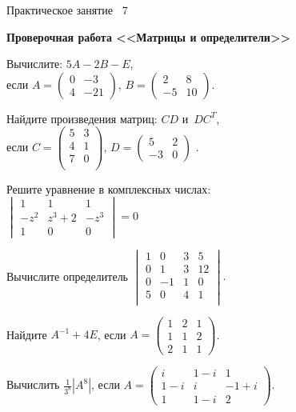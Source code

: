 \documentclass[a5paper,17pt]{extarticle}
\begin{document}
\begin{enumerate}
{\item[]\centering \small Практическое занятие \textnumero~7 
\par\bfseries Проверочная работа <<Матрицы и определители>>\par}

\item Вычислите: $5A-2B-E$,\\ если
$A=\begin{pmatrix}0&-3\\4&-21\end{pmatrix}$,
$B=\begin{pmatrix}2&8\\-5&10\end{pmatrix}$.

\item Найдите произведения матриц: $CD$ и~$DC^T$,\\ если
$C=\begin{pmatrix}5&3\\4 & 1\\ 7 & 0\\ \end{pmatrix}$, 
$D=\begin{pmatrix}5&2\\-3&0\end{pmatrix}$ .

\item Решите уравнение в комплексных числах: \\
$\begin{vmatrix}
1& 1& 1\\
-z^2& z^3+2& -z^3\\
1& 0& 0
\end{vmatrix}=0$



\item Вычислите определитель $
\begin{vmatrix}
1 & 0 & 3 & 5 \\
0 & 1 & 3 & 12\\
0 & -1 & 1 & 0\\
5 & 0 & 4 & 1\\
\end{vmatrix}.
$

\item Найдите $A^{-1}+4E$, если
$A=\begin{pmatrix}1 & 2 & 1\\ 1 & 1 & 2\\ 2 & 1 & 1\end{pmatrix}$.


\item Вычислить $\frac{1}{3^{8}}\left| A^{8}\right|$, если $A=\begin{pmatrix}i & 1-i & 1\\ 1-i & i & -1+i\\ 1 & 1-i & 2\end{pmatrix}$.
\end{enumerate}
\newpage
\end{document}
